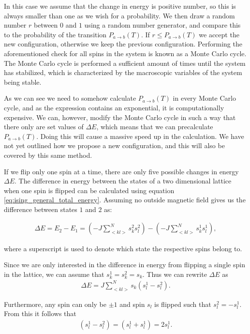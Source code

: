 \documentclass[reprint,english,notitlepage]{revtex4-1}  %
\begin{document}
In this case we assume that the change in energy is positive number, so this is always smaller than one as we wish for a probability. We then draw a random number $r$ between $0$ and $1$ using a random number generator, and compare this to the probability of the transition $P_{a\to b}(T)$. If $r\leq P_{a\to b} (T)$ we accept the new configuration, otherwise we keep the previous configuration. Performing the aforementioned check for all spins in the system is known as a Monte Carlo cycle. The Monte Carlo cycle is performed a sufficient amount of times until the system has stabilized, which is characterized by the macroscopic variables of the system being stable.

As we can see we need to somehow calculate $P_{a\to b} (T)$ in every Monte Carlo cycle, and as the expression contains an exponential, it is computationally expensive. We can, however, modify the Monte Carlo cycle in such a way that there only are set values of $\Delta E$, which means that we can precalculate $P_{a\to b} (T)$. Doing this will cause a massive speed up in the calculation. We have not yet outlined how we propose a new configuration, and this will also be covered by this same method.

If we flip only one spin at a time, there are only five possible changes in energy $\Delta E$. The difference in energy between the states of a two dimensional lattice when one spin is flipped can be calculated using equation \eqref{eq:ising_general_total_energy}. Assuming no outside magnetic field gives us the difference between states \(1\) and \(2\) as:

\begin{align*}
	\Delta E = E_{2} - E_{1} = \left(-J \sum\limits_{<kl>}^N s_k^{2} s_l^{2}\right) -
	\left(-J \sum\limits_{<kl>}^N s_k^{1} s_l^{1}\right),
\end{align*}

where a superscript is used to denote which state the respective spins belong to.

Since we are only interested in the difference in energy from flipping a single spin in the lattice, we can assume that \(s_{k}^{1} = s_{k}^{2} = s_{k}\). Thus we can rewrite \(\Delta E\) as
\begin{align*}
 	\Delta E = J \sum_{<kl>}^{N} s_{k} \left(s_{l}^{1} - s_{l}^{2}\right).
\end{align*}

Furthermore, any spin can only be \(\pm 1\) and spin \(s_{l}\) is flipped such that \(s_{l}^{2} = -s_{l}^{1}\). From this it follows that \begin{align*}
	\left(s_{l}^{1} - s_{l}^{2}\right) = \left(s_{l}^{1} + s_{l}^{1}\right) = 2s_{l}^{1}.
\end{align*}
\end{document}
